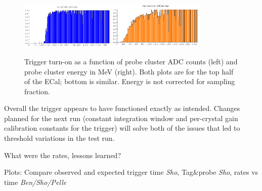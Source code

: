 \begin{figure}[ht]
	\includegraphics[width=0.4\textwidth]{test2012/ecalperformance/top_turnon_adc}
	\includegraphics[width=0.4\textwidth]{test2012/ecalperformance/top_turnon_e}
	\caption{\small{Trigger turn-on as a function of probe cluster ADC counts (left) and probe cluster energy in MeV (right). Both plots are for the top half of the ECal; bottom is similar. 
	Energy is not corrected for sampling fraction.}}
	\label{fig:turnon}
\end{figure}

Overall the trigger appears to have functioned exactly as intended. Changes planned for the next run (constant integration window and per-crystal gain calibration constants for the trigger) will solve both of the issues that led to threshold variations in the test run.

What were the rates, lessons learned?

Plots: Compare observed and expected trigger time {\it Sho}, Tag\&probe {\it Sho}, rates vs time {\it Ben/Sho/Pelle}


